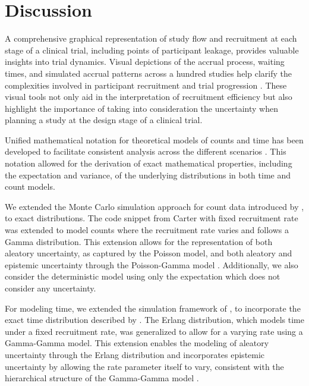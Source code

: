 

\chapter{Discussion}

A comprehensive graphical representation of study flow and recruitment at each stage of a clinical trial, including points of participant leakage, provides valuable insights into trial dynamics. Visual depictions of the accrual process, waiting times, and simulated accrual patterns across a hundred studies help clarify the complexities involved in participant recruitment and trial progression \citep{spiegelhalter2011visualizing}. These visual tools not only aid in the interpretation of recruitment efficiency but also highlight the importance of taking into consideration the uncertainty when planning a study at the design stage of a clinical trial.

Unified mathematical notation for theoretical models of counts and time has been developed to facilitate consistent analysis across the different scenarios \citep{anisimov2007modelling}. This notation allowed for the derivation of exact mathematical properties, including the expectation and variance, of the underlying distributions in both time and count models.

We extended the Monte Carlo simulation approach for count data introduced by \cite{carter2004application}, to exact distributions. The code snippet from Carter with fixed recruitment rate was extended to model counts where the recruitment rate varies and follows a Gamma distribution. This extension allows for the representation of both aleatory uncertainty, as captured by the Poisson model, and both aleatory and epistemic uncertainty through the Poisson-Gamma model \citep{ohagan2006}. Additionally, we also consider the deterministic model using only the expectation which does not consider any uncertainty. 


For modeling time, we extended the simulation framework of \cite{carter2004application}, to incorporate the exact time distribution described by \cite{bagiella2001predicting}. The Erlang distribution, which models time under a fixed recruitment rate, was generalized to allow for a varying rate using a Gamma-Gamma model. This extension enables the modeling of aleatory uncertainty through the Erlang distribution and incorporates epistemic uncertainty by allowing the rate parameter itself to vary, consistent with the hierarchical structure of the Gamma-Gamma model \citep{ohagan2006}.


